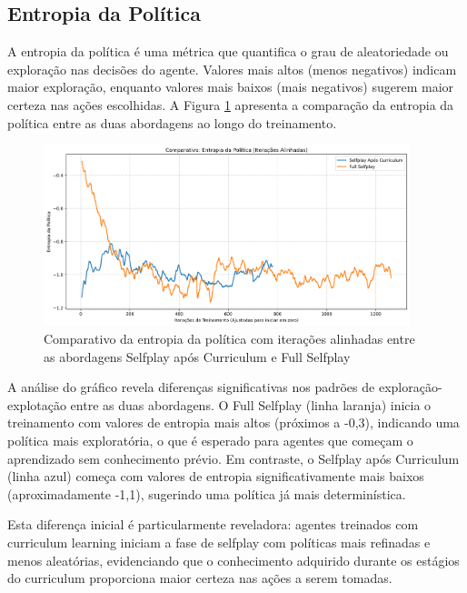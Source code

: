 \subsection{Entropia da Política}

A entropia da política é uma métrica que quantifica o grau de aleatoriedade ou exploração nas decisões do agente. Valores mais altos (menos negativos) indicam maior exploração, enquanto valores mais baixos (mais negativos) sugerem maior certeza nas ações escolhidas. A Figura \ref{fig:policy_entropy} apresenta a comparação da entropia da política entre as duas abordagens ao longo do treinamento.

\begin{figure}[H]
    \centering
    \includegraphics[width=0.95\textwidth]{fig/graficos_trabalho/graficos_experimentos/geral/comparativo_entropia_politica_alinhado.png}
    \caption{Comparativo da entropia da política com iterações alinhadas entre as abordagens Selfplay após Curriculum e Full Selfplay}
    \label{fig:policy_entropy}
\end{figure}

A análise do gráfico revela diferenças significativas nos padrões de exploração-explotação entre as duas abordagens. O Full Selfplay (linha laranja) inicia o treinamento com valores de entropia mais altos (próximos a -0,3), indicando uma política mais exploratória, o que é esperado para agentes que começam o aprendizado sem conhecimento prévio. Em contraste, o Selfplay após Curriculum (linha azul) começa com valores de entropia significativamente mais baixos (aproximadamente -1,1), sugerindo uma política já mais determinística.

Esta diferença inicial é particularmente reveladora: agentes treinados com curriculum learning iniciam a fase de selfplay com políticas mais refinadas e menos aleatórias, evidenciando que o conhecimento adquirido durante os estágios do curriculum proporciona maior certeza nas ações a serem tomadas.

